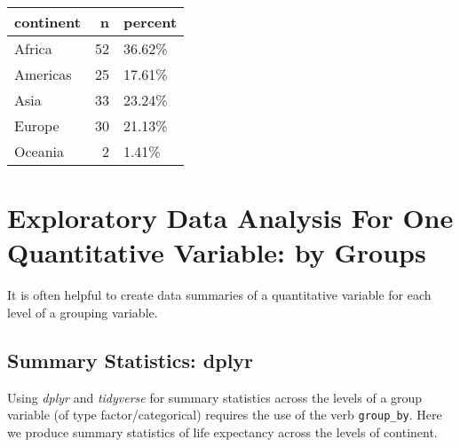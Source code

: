 \documentclass[]{book}
\newenvironment{Shaded}{\begin{snugshade}}{\end{snugshade}}
\newcommand{\KeywordTok}[1]{\textcolor[rgb]{0.13,0.29,0.53}{\textbf{#1}}}
\newcommand{\DataTypeTok}[1]{\textcolor[rgb]{0.13,0.29,0.53}{#1}}
\newcommand{\DecValTok}[1]{\textcolor[rgb]{0.00,0.00,0.81}{#1}}
\newcommand{\FloatTok}[1]{\textcolor[rgb]{0.00,0.00,0.81}{#1}}
\newcommand{\StringTok}[1]{\textcolor[rgb]{0.31,0.60,0.02}{#1}}
\newcommand{\CommentTok}[1]{\textcolor[rgb]{0.56,0.35,0.01}{\textit{#1}}}
\newcommand{\OtherTok}[1]{\textcolor[rgb]{0.56,0.35,0.01}{#1}}
\newcommand{\OperatorTok}[1]{\textcolor[rgb]{0.81,0.36,0.00}{\textbf{#1}}}
\newcommand{\NormalTok}[1]{#1}
\begin{document}
\begin{tabular}{l|r|l}
\hline
continent & n & percent\\
\hline
Africa & 52 & 36.62\%\\
\hline
Americas & 25 & 17.61\%\\
\hline
Asia & 33 & 23.24\%\\
\hline
Europe & 30 & 21.13\%\\
\hline
Oceania & 2 & 1.41\%\\
\hline
\end{tabular}

\chapter{Exploratory Data Analysis For One Quantitative Variable: by
Groups}\label{exploratory-data-analysis-for-one-quantitative-variable-by-groups}

It is often helpful to create data summaries of a quantitative variable
for each level of a grouping variable.

\section{Summary Statistics: dplyr}\label{summary-statistics-dplyr}

Using \emph{dplyr} and \emph{tidyverse} for summary statistics across
the levels of a group variable (of type factor/categorical) requires the
use of the verb \texttt{group\_by}. Here we produce summary statistics
of life expectancy across the levels of continent.

\begin{Shaded}
\end{Shaded}
\end{document}
